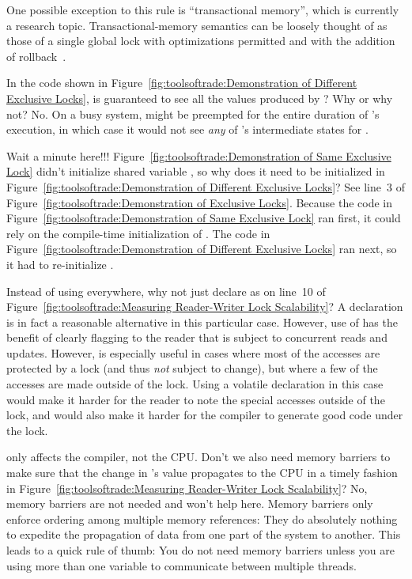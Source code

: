 	One possible exception to this rule is ``transactional memory'',
	which is currently a research topic.
	Transactional-memory semantics can be loosely thought of as those
	of a single global lock with optimizations permitted and
	with the addition of rollback~\cite{HansJBoehm2009HOTPAR}.

\QuickQ{}
	In the code shown in
	Figure~\ref{fig:toolsoftrade:Demonstration of Different Exclusive Locks},
	is  guaranteed to see all the values produced
	by ?
	Why or why not?
\QuickA{}
	No.
	On a busy system,  might be preempted
	for the entire duration of 's execution,
	in which case it would not see \emph{any} of 's
	intermediate states for .

\QuickQ{}
	Wait a minute here!!!
	Figure~\ref{fig:toolsoftrade:Demonstration of Same Exclusive Lock}
	didn't initialize shared variable ,
	so why does it need to be initialized in
	Figure~\ref{fig:toolsoftrade:Demonstration of Different Exclusive Locks}?
\QuickA{}
	See line~3 of
	Figure~\ref{fig:toolsoftrade:Demonstration of Exclusive Locks}.
	Because the code in
	Figure~\ref{fig:toolsoftrade:Demonstration of Same Exclusive Lock}
	ran first, it could rely on the compile-time initialization of
	.
	The code in
	Figure~\ref{fig:toolsoftrade:Demonstration of Different Exclusive Locks}
	ran next, so it had to re-initialize .

\QuickQ{}
	Instead of using  everywhere, why not just
	declare  as  on line~10 of
	Figure~\ref{fig:toolsoftrade:Measuring Reader-Writer Lock Scalability}?
\QuickA{}
	A  declaration is in fact a reasonable alternative in
	this particular case.
	However, use of  has the benefit of clearly
	flagging to the reader that  is subject to concurrent
	reads and updates.
	However,  is especially useful in cases where
	most of the accesses are protected by a lock (and thus \emph{not}
	subject to change), but where a few of the accesses are made outside
	of the lock.
	Using a volatile declaration in this case would make it harder
	for the reader to note the special accesses outside of the lock,
	and would also make it harder for the compiler to generate good
	code under the lock.

\QuickQ{}
	 only affects the compiler, not the CPU.
	Don't we also need memory barriers to make sure
	that the change in 's value propagates to the
	CPU in a timely fashion in
	Figure~\ref{fig:toolsoftrade:Measuring Reader-Writer Lock Scalability}?
\QuickA{}
	No, memory barriers are not needed and won't help here.
	Memory barriers only enforce ordering among multiple
	memory references:  They do absolutely nothing to expedite
	the propagation of data from one part of the system to
	another.
	This leads to a quick rule of thumb:  You do not need
	memory barriers unless you are using more than one
	variable to communicate between multiple threads.

